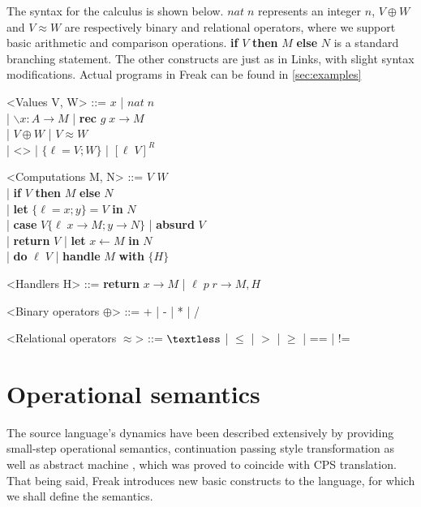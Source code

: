 \documentclass{article}
\theoremstyle{definition}
\theoremstyle{lemma}
\theoremstyle{observation}
\theoremstyle{theorem}
\newcommand*{\fullref}[1]{\hyperref[{#1}]{\autoref*{#1} \nameref*{#1}}}
\begin{document}
    The syntax for the calculus is shown below. $nat \; n$ represents an integer $n$,
    $V \oplus W$ and $V \approx W$ are respectively binary and relational
    operators, where we support basic arithmetic and comparison operations.
    \textbf{if} $V$ \textbf{then} $M$ \textbf{else} $N$ is a standard branching statement.
    The other constructs are just as in Links, with slight syntax modifications.
    Actual programs in Freak can be found in \fullref{sec:examples}

    \begin{grammar}

        <Values V, W> ::= $ x $ | $nat \; n$ \\
            | $ \backslash x : A \rightarrow M $ | \textbf{rec} $ g \; x \rightarrow M $\\
            | $V \oplus W$ | $V \approx W$ \\
            | <> | $ \{ \ell = V; W\} $  | $[ \ell \; V]^{R}$

        <Computations M, N> ::= $ V $ $ W $ \\
            | \textbf{if} $V$ \textbf{then} $M$ \textbf{else} $N$ \\
            | \textbf{let} $\{\ell  = x; y\} = V$ \textbf{in} $ N $ \\
            | \textbf{case} $V \{ \ell \; x \rightarrow M; y \rightarrow N\}$ | \textbf{absurd} $ V $ \\
            | \textbf{return} $V$ | \textbf{let} $ x \leftarrow M $ \textbf{in} $ N $ \\
            | \textbf{do} $\ell \; V$ | \textbf{handle} $M$ \textbf{with} $ \{ H \} $

        <Handlers H> ::= \textbf{return} $ x \rightarrow M $ | $ \ell \; p \; r \rightarrow M, H $

        <Binary operators $\oplus$> ::= + | - | * | /

        <Relational operators $\approx$> ::= $ \textless $ | $\leqslant$ | $>$ | $\geqslant$ | == | !=

    \end{grammar}

\section{Operational semantics}

    The source language's dynamics have been described
    extensively by providing small-step operational semantics,
    continuation passing style transformation \cite{handlers-cps} as well
    as abstract machine \cite{liberating-effects}, which was proved to coincide
    with CPS translation. That being said, Freak introduces new basic
    constructs to the language, for which we shall define the semantics.
\end{document}

